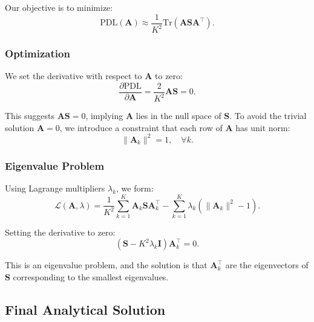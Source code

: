 \documentclass[journal]{IEEEtran}
\begin{document}
Our objective is to minimize:
\begin{equation} \label{eq15}
\text{PDL}(\mathbf{A}) \approx \frac{1}{K^2} \text{Tr}\left( \mathbf{A} \mathbf{S} \mathbf{A}^\top \right).
\end{equation}

\subsubsection{Optimization}

We set the derivative with respect to \( \mathbf{A} \) to zero:
\begin{equation} \label{eq16}
\frac{\partial \text{PDL}}{\partial \mathbf{A}} = \frac{2}{K^2} \mathbf{A} \mathbf{S} = 0.
\end{equation}

This suggests \( \mathbf{A} \mathbf{S} = 0 \), implying \( \mathbf{A} \) lies in the null space of \( \mathbf{S} \). To avoid the trivial solution \( \mathbf{A} = 0 \), we introduce a constraint that each row of \( \mathbf{A} \) has unit norm:
\begin{equation} \label{eq17}
\| \mathbf{A}_k \|^2 = 1, \quad \forall k.
\end{equation}

\subsubsection{Eigenvalue Problem}

Using Lagrange multipliers \( \lambda_k \), we form:
\begin{equation} \label{eq18}
\mathcal{L}(\mathbf{A}, \lambda) = \frac{1}{K^2} \sum_{k=1}^{K} \mathbf{A}_k \mathbf{S} \mathbf{A}_k^\top - \sum_{k=1}^{K} \lambda_k (\| \mathbf{A}_k \|^2 - 1).
\end{equation}

Setting the derivative to zero:
\begin{equation} \label{eq19}
\left( \mathbf{S} - K^2 \lambda_k \mathbf{I} \right) \mathbf{A}_k^\top = 0.
\end{equation}

This is an eigenvalue problem, and the solution is that \( \mathbf{A}_k^\top \) are the eigenvectors of \( \mathbf{S} \) corresponding to the smallest eigenvalues.

\subsection{Final Analytical Solution}
\end{document}
